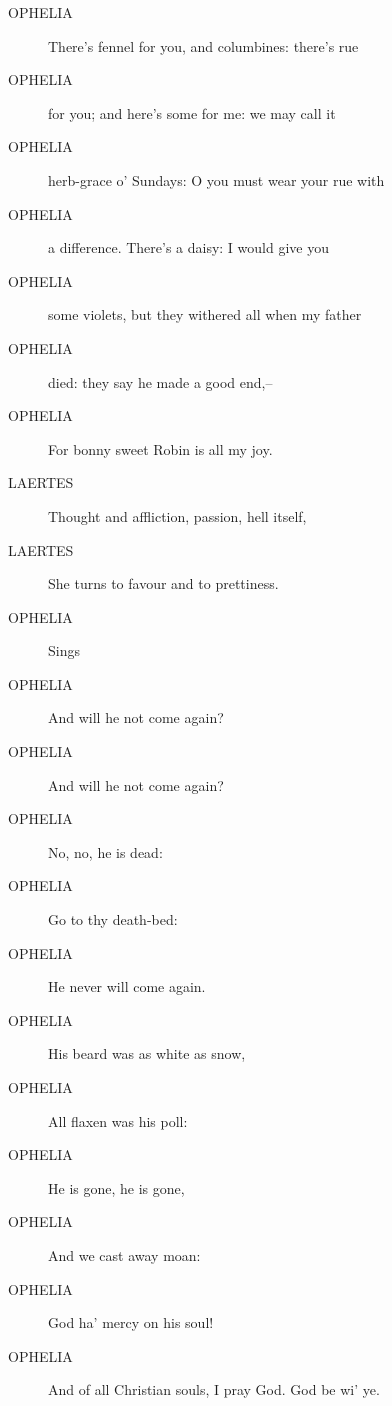 \documentclass{article}
\begin{document}
\begin{description}
            
\item[OPHELIA] There's fennel for you, and columbines: there's rue
\item[OPHELIA] for you; and here's some for me: we may call it
\item[OPHELIA] herb-grace o' Sundays: O you must wear your rue with
\item[OPHELIA] a difference. There's a daisy: I would give you
\item[OPHELIA] some violets, but they withered all when my father
\item[OPHELIA] died: they say he made a good end,--
\item[OPHELIA] For bonny sweet Robin is all my joy.
\end{description}
          
\begin{description}
            
\item[LAERTES] Thought and affliction, passion, hell itself,
\item[LAERTES] She turns to favour and to prettiness.
\end{description}
          
\begin{description}
            
\item[OPHELIA] 
               Sings
            
\item[OPHELIA] And will he not come again?
\item[OPHELIA] And will he not come again?
\item[OPHELIA] No, no, he is dead:
\item[OPHELIA] Go to thy death-bed:
\item[OPHELIA] He never will come again.
\item[OPHELIA] His beard was as white as snow,
\item[OPHELIA] All flaxen was his poll:
\item[OPHELIA] He is gone, he is gone,
\item[OPHELIA] And we cast away moan:
\item[OPHELIA] God ha' mercy on his soul!
\item[OPHELIA] And of all Christian souls, I pray God. God be wi' ye.
\end{description}
          
\end{document}
